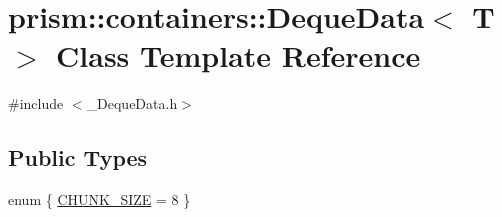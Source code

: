 \hypertarget{classprism_1_1containers_1_1_deque_data}{}\section{prism\+:\+:containers\+:\+:Deque\+Data$<$ T $>$ Class Template Reference}
\label{classprism_1_1containers_1_1_deque_data}


{\ttfamily \#include $<$\+\_\+\+Deque\+Data.\+h$>$}

\subsection*{Public Types}
\begin{DoxyCompactItemize}
\item 
enum \{ \hyperlink{classprism_1_1containers_1_1_deque_data_aed08082decb29717e0d968fabb1f1ea4a772861c6d49ff3131a0f2acd7e4b588b}{C\+H\+U\+N\+K\+\_\+\+S\+I\+ZE} = 8
 \}
\end{DoxyCompactItemize}
